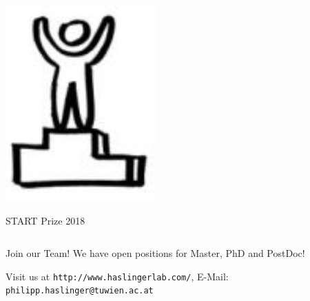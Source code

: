 \documentclass[final]{beamer}
\begin{document}
\begin{frame}[fragile]{}
\begin{columns}[T]
\begin{column}{.49\linewidth}
\begin{block}{}
\begin{columns}
\begin{column}{0.07\columnwidth}
            \includegraphics[width=\columnwidth]{figures/logo-start.png}

            START Prize 2018
          \end{column}
        \end{columns}
      \end{block}


      \begin{block}{\Large Join our Team!}
        {\Large We have open positions for Master, PhD and PostDoc!}

        Visit us at \texttt{http://www.haslingerlab.com/}, E-Mail: \texttt{philipp.haslinger@tuwien.ac.at}
      \end{block}
    \end{column}

  \end{columns}

\end{frame}
\end{document}
